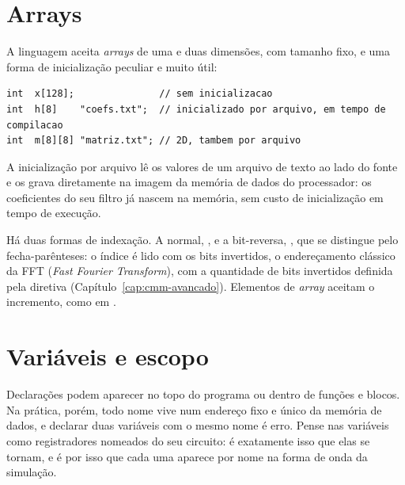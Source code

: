 \section{Arrays}

A linguagem aceita \textit{arrays} de uma e duas dimensões, com tamanho fixo, e uma forma de inicialização peculiar e muito útil:

\begin{lstlisting}[style=cmm]
int  x[128];               // sem inicializacao
int  h[8]    "coefs.txt";  // inicializado por arquivo, em tempo de compilacao
int  m[8][8] "matriz.txt"; // 2D, tambem por arquivo
\end{lstlisting}

A inicialização por arquivo lê os valores de um arquivo de texto ao lado do fonte e os grava diretamente na imagem da memória de dados do processador: os coeficientes do seu filtro já nascem na memória, sem custo de inicialização em tempo de execução.

Há duas formas de indexação. A normal, , e a bit-reversa, \code{x[k)}, que se distingue pelo fecha-parênteses: o índice é lido com os bits invertidos, o endereçamento clássico da FFT (\textit{Fast Fourier Transform}), com a quantidade de bits invertidos definida pela diretiva  (Capítulo~\ref{cap:cmm-avancado}). Elementos de \textit{array} aceitam o incremento, como em .

\section{Variáveis e escopo}

Declarações podem aparecer no topo do programa ou dentro de funções e blocos. Na prática, porém, todo nome vive num endereço fixo e único da memória de dados, e declarar duas variáveis com o mesmo nome é erro. Pense nas variáveis \cmm{} como registradores nomeados do seu circuito: é exatamente isso que elas se tornam, e é por isso que cada uma aparece por nome na forma de onda da simulação.
